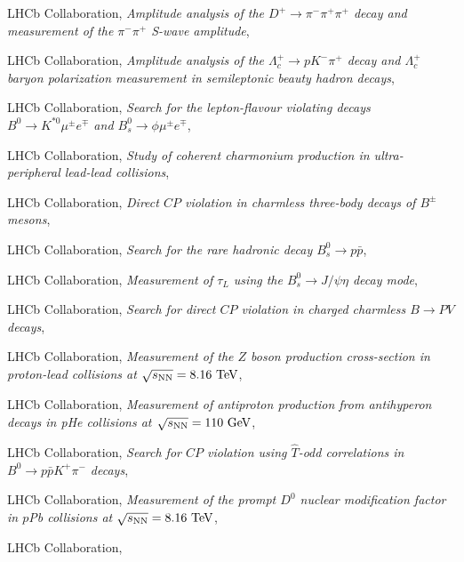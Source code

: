 \begin{cvcontent}
\begin{enumerate}[label={[\arabic*]}, leftmargin=1.5cm]
    \item LHCb Collaboration,
    \emph{Amplitude analysis of the $D^+\to\pi^- \pi^+\pi^+$ decay and measurement of the $\pi^-\pi^+$ S-wave amplitude},
    \item LHCb Collaboration,
    \emph{Amplitude analysis of the $\Lambda^+_c\to pK^-\pi^+$ decay and $\Lambda^+_c$ baryon polarization measurement in semileptonic beauty hadron decays},
    \item LHCb Collaboration,
    \emph{Search for the lepton-flavour violating decays $B^0 \to K^{*0} \mu^\pm e^\mp$ and $B_s^0 \to \phi \mu^\pm e^\mp$},
    \item LHCb Collaboration,
    \emph{Study of coherent charmonium production in ultra-peripheral lead-lead collisions},
    \sloppy
    \item LHCb Collaboration,
    \emph{Direct $CP$ violation in charmless three-body decays of $B^{\pm}$ mesons},
    \item LHCb Collaboration,
    \emph{Search for the rare hadronic decay $B_s^0\to p \bar{p}$},
    \item LHCb Collaboration,
    \emph{Measurement of $\tau_{L}$ using the $B_{s}^{0} \to J/\psi \eta$ decay mode},
    \item LHCb Collaboration,
    \emph{Search for direct $CP$ violation in charged charmless $B \to PV$ decays},
    \item LHCb Collaboration,
    \emph{Measurement of the $Z$ boson production cross-section in proton-lead collisions at $\sqrt{s_{\rm{NN}}}=8.16~\rm{TeV}$},
    \item LHCb Collaboration,
    \emph{Measurement of antiproton production from antihyperon decays in pHe collisions at $\sqrt{s_{\rm{NN}}}=110~\rm{GeV}$},
    \item LHCb Collaboration,
    \emph{Search for $CP$ violation using $\hat{T}$-odd correlations in $B^{0} \to p \bar p K^{+} \pi^{-}$ decays},
    \item LHCb Collaboration,
    \emph{Measurement of the prompt $D^0$ nuclear modification factor in $p$Pb collisions at $\sqrt{s_{\rm{NN}}} = 8.16~{\rm{TeV}}$},
    \item LHCb Collaboration,

\end{enumerate}
\end{cvcontent}
